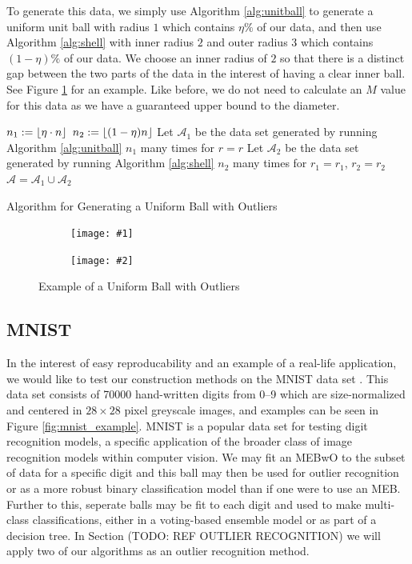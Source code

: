 \documentclass[11pt,twoside]{report}
\newcommand{\A}{\mathcal{A}} %
\newcommand{\pairfigure}[4]{
    \begin{figure}[ht]
        \centering
        \begin{subfigure}[b]{0.475\textwidth}
            \centering
            \texttt{[image: \#1]}
        \end{subfigure}
        \hfill
        \begin{subfigure}[b]{0.475\textwidth}
            \centering
            \texttt{[image: \#2]}
        \end{subfigure}
        \caption{#3}
        \label{#4}
\end{figure}
}
\newcommand{\datafigure}[3]{
    \pairfigure{data_plots/#1_2d.png}{data_plots/#1_3d.png}{#2}{#3}
}
\DeclarePairedDelimiter\floor{\lfloor}{\rfloor}
\theoremstyle{definition}
\numberwithin{theorem}{section}
\numberwithin{definition}{section}
\numberwithin{lemma}{section}
\numberwithin{proposition}{section}
\numberwithin{equation}{section}
\numberwithin{figure}{section}
\begin{document}
To generate this data, we simply use Algorithm \ref{alg:unitball} to generate a uniform unit ball with radius $1$ which contains $\eta\%$ of our data, and then use Algorithm \ref{alg:shell} with inner radius $2$ and outer radius $3$ which contains $(1-\eta)\%$ of our data. We choose an inner radius of $2$ so that there is a distinct gap between the two parts of the data in the interest of having a clear inner ball. See Figure \ref{fig:unifballoutliers} for an example. Like before, we do not need to calculate an $M$ value for this data as we have a guaranteed upper bound to the diameter.

\begin{algorithm}
    \KwOut{Data set $\A\subseteq\mathbb{R}^d$}
    
    $n_1:=\floor{\eta\cdot n}$\;
    $n_2:=\floor{(1-\eta)n}$\;
    Let $\A_1$ be the data set generated by running Algorithm \ref{alg:unitball} $n_1$ many times for $r=r$\;
    Let $\A_2$ be the data set generated by running Algorithm \ref{alg:shell} $n_2$ many times for $r_1=r_1$, $r_2=r_2$\;
    $\A=\A_1\cup\A_2$\;
    \KwRet{$\A$}
    
    \caption{Algorithm for Generating a Uniform Ball with Outliers}
    \label{alg:unifballoutliers}
\end{algorithm}

\datafigure{uniform_ball_with_outliers}{Example of a Uniform Ball with Outliers}{fig:unifballoutliers}


\subsection{MNIST}

In the interest of easy reproducability and an example of a real-life application, we would like to test our construction methods on the MNIST data set \cite{lecun2010mnist}. This data set consists of 70000 hand-written digits from 0--9 which are size-normalized and centered in $28\times28$ pixel greyscale images, and examples can be seen in Figure \ref{fig:mnist_example}. MNIST is a popular data set for testing digit recognition models, a specific application of the broader class of image recognition models within computer vision. We may fit an MEBwO to the subset of data for a specific digit and this ball may then be used for outlier recognition or as a more robust binary classification model than if one were to use an MEB. Further to this, seperate balls may be fit to each digit and used to make multi-class classifications, either in a voting-based ensemble model or as part of a decision tree. In Section (TODO: REF OUTLIER RECOGNITION) we will apply two of our algorithms as an outlier recognition method.
\end{document}
